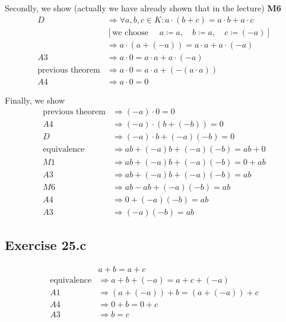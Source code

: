 \documentclass[a4paper]{article}
\theoremstyle{definition}
\begin{document}
Secondly, we show (actually we have already shown that in the lecture) \textbf{M6}
\begin{align*}
                        D &\Rightarrow \forall a,b,c \in K: a \cdot (b + c) = a \cdot b + a \cdot c \\
                          & [\text{we choose } \quad a \coloneqq a, \quad b \coloneqq a, \quad c \coloneqq (-a)] \\
                          &\Rightarrow a \cdot (a + (-a)) = a \cdot a + a \cdot (-a) \\
                       A3 &\Rightarrow a \cdot 0 = a \cdot a + a \cdot (-a) \\
  \text{previous theorem} &\Rightarrow a \cdot 0 = a \cdot a + (- (a \cdot a)) \\
                       A4 &\Rightarrow a \cdot 0 = 0
\end{align*}

Finally, we show
\begin{align*}
  \text{previous theorem} &\Rightarrow (-a) \cdot 0 = 0 \\
                       A4 &\Rightarrow (-a) \cdot (b + (-b)) = 0 \\
                        D &\Rightarrow (-a) \cdot b + (-a) (-b) = 0 \\
       \text{equivalence} &\Rightarrow ab + (-a) b + (-a) (-b) = ab + 0 \\
                       M1 &\Rightarrow ab + (-a) b + (-a) (-b) = 0 + ab \\
                       A3 &\Rightarrow ab + (-a) b + (-a) (-b) = ab \\
                       M6 &\Rightarrow ab - a b + (-a) (-b) = ab \\
                       A4 &\Rightarrow 0 + (-a) (-b) = ab \\
                       A3 &\Rightarrow (-a) (-b) = ab
\end{align*}

\subsection{Exercise 25.c}

\begin{align*}
                     & a + b = a + c \\
  \text{equivalence} &\Rightarrow a + b + (-a) = a + c + (-a) \\
                  A1 &\Rightarrow (a + (-a)) + b = (a + (-a)) + c \\
                  A4 &\Rightarrow 0 + b = 0 + c \\
                  A3 &\Rightarrow b = c
\end{align*}
\end{document}
